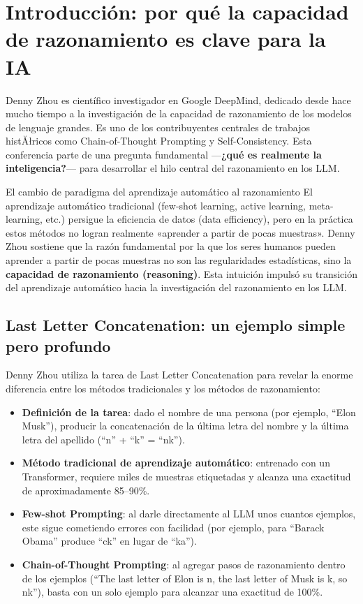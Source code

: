 \section{Introducción: por qué la capacidad de razonamiento es clave para la IA}

Denny Zhou es científico investigador en Google DeepMind, dedicado desde hace mucho tiempo a la investigación de la capacidad de razonamiento de los modelos de lenguaje grandes. Es uno de los contribuyentes centrales de trabajos histĂłricos como Chain-of-Thought Prompting y Self-Consistency. Esta conferencia parte de una pregunta fundamental —\textbf{¿qué es realmente la inteligencia?}— para desarrollar el hilo central del razonamiento en los LLM.

\begin{knowledgebox}{El cambio de paradigma del aprendizaje automático al razonamiento}
El aprendizaje automático tradicional (few-shot learning, active learning, meta-learning, etc.) persigue la eficiencia de datos (data efficiency), pero en la práctica estos métodos no logran realmente «aprender a partir de pocas muestras». Denny Zhou sostiene que la razón fundamental por la que los seres humanos pueden aprender a partir de pocas muestras no son las regularidades estadísticas, sino la \textbf{capacidad de razonamiento (reasoning)}. Esta intuición impulsó su transición del aprendizaje automático hacia la investigación del razonamiento en los LLM.
\end{knowledgebox}

\subsection{Last Letter Concatenation: un ejemplo simple pero profundo}

Denny Zhou utiliza la tarea de Last Letter Concatenation para revelar la enorme diferencia entre los métodos tradicionales y los métodos de razonamiento:

\begin{itemize}
    \item \textbf{Definición de la tarea}: dado el nombre de una persona (por ejemplo, ``Elon Musk''), producir la concatenación de la última letra del nombre y la última letra del apellido (``n'' + ``k'' = ``nk'').
    \item \textbf{Método tradicional de aprendizaje automático}: entrenado con un Transformer, requiere miles de muestras etiquetadas y alcanza una exactitud de aproximadamente 85--90\%.
    \item \textbf{Few-shot Prompting}: al darle directamente al LLM unos cuantos ejemplos, este sigue cometiendo errores con facilidad (por ejemplo, para ``Barack Obama'' produce ``ck'' en lugar de ``ka'').
    \item \textbf{Chain-of-Thought Prompting}: al agregar pasos de razonamiento dentro de los ejemplos (``The last letter of Elon is n, the last letter of Musk is k, so nk''), basta con un solo ejemplo para alcanzar una exactitud de 100\%.
\end{itemize}

